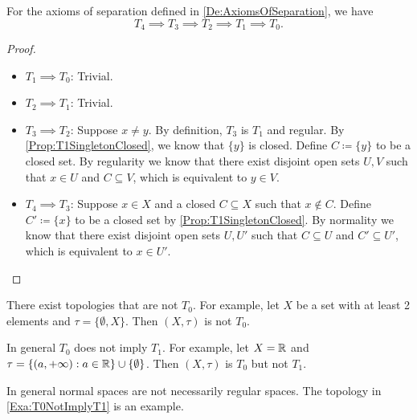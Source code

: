 \documentclass[screen,single]{techreport}
\numberwithin{equation}{section}
\begin{document}
\begin{theorem}\label{The:HierarchyOfSeparation}
	For the axioms of separation defined in \cref{De:AxiomsOfSeparation}, we have
	\begin{equation*}
		T_4 \implies T_3 \implies T_2 \implies T_1 \implies T_0.
	\end{equation*}
\end{theorem}
\begin{proof}\
	\begin{itemize}
		\item $T_1 \implies T_0$: Trivial.
		\item $T_2 \implies T_1$: Trivial.
		\item $T_3 \implies T_2$: Suppose $x \neq y$. By definition, $T_3$ is $T_1$ and regular.
		By \cref{Prop:T1SingletonClosed}, we know that $\{y\}$ is closed.
		Define $C \coloneqq \{ y\}$ to be a closed set.
		By regularity we know that there exist disjoint open sets $U,V$ such that $x \in U$ and $C \subseteq V$, which is equivalent to $y \in V$.
		\item $T_4 \implies T_3$: Suppose $x \in X$ and a closed $C \subseteq X$ such that $x \not\in C$.
		Define $C' \coloneqq \{ x\}$ to be a closed set by \cref{Prop:T1SingletonClosed}.
		By normality we know that there exist disjoint open sets $U,U'$ such that $C \subseteq U$ and $C' \subseteq U'$, which is equivalent to $x \in U'$.
	\end{itemize}
\end{proof}

\begin{example}\label{Exa:NotT0}
	There exist topologies that are not $T_0$.
	For example, let $X$ be a set with at least 2 elements and $\tau = \{ \emptyset, X\}$.
	Then $(X,\tau)$ is not $T_0$.
\end{example}

\begin{example}\label{Exa:T0NotImplyT1}
	In general $T_0$ does not imply $T_1$.
	For example, let $X = \mathbb{R}$ and $\tau = \{ (a, +\infty) : a \in \mathbb{R} \} \cup \{ \emptyset \}$.
	Then $(X,\tau)$ is $T_0$ but not $T_1$.
\end{example}

\begin{example}\label{Exa:NormalNotImplyRegular}
	In general normal spaces are not necessarily regular spaces.
	The topology in \cref{Exa:T0NotImplyT1} is an example.
\end{example}
\end{document}
